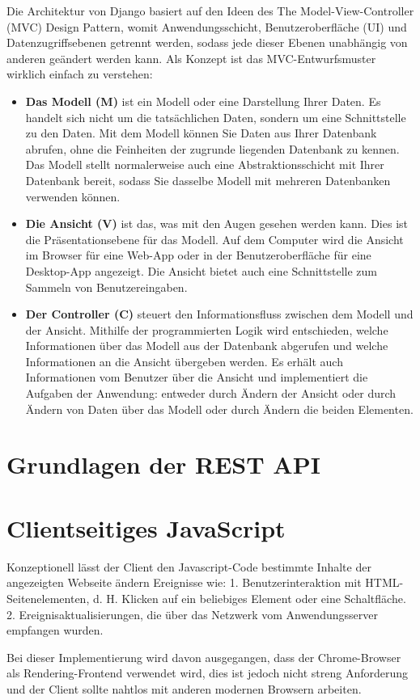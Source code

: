 Die Architektur von Django basiert auf den Ideen des The Model-View-Controller (MVC) Design Pattern, womit Anwendungsschicht, Benutzeroberfläche (UI) und Datenzugriffsebenen getrennt werden, sodass jede dieser Ebenen unabhängig von anderen geändert werden kann. Als Konzept ist das MVC-Entwurfsmuster wirklich einfach zu verstehen\cite[pp. 15-16]{george:django}:
\begin{itemize}
	\item \textbf{Das Modell (M)} ist ein Modell oder eine Darstellung Ihrer Daten. Es handelt sich nicht um die tatsächlichen Daten, sondern um eine Schnittstelle zu den Daten. Mit dem Modell können Sie Daten aus Ihrer Datenbank abrufen, ohne die Feinheiten der zugrunde liegenden Datenbank zu kennen. Das Modell stellt normalerweise auch eine Abstraktionsschicht mit Ihrer Datenbank bereit, sodass Sie dasselbe Modell mit mehreren Datenbanken verwenden können.
	\item \textbf{Die Ansicht (V)} ist das, was mit den Augen gesehen werden kann. Dies ist die Präsentationsebene für das Modell. Auf dem Computer wird die Ansicht im Browser für eine Web-App oder in der Benutzeroberfläche für eine Desktop-App angezeigt. Die Ansicht bietet auch eine Schnittstelle zum Sammeln von Benutzereingaben.
	\item \textbf{Der Controller (C)} steuert den Informationsfluss zwischen dem Modell und der Ansicht. Mithilfe der programmierten Logik wird entschieden, welche Informationen über das Modell aus der Datenbank abgerufen und welche Informationen an die Ansicht übergeben werden. Es erhält auch Informationen vom Benutzer über die Ansicht und implementiert die Aufgaben der Anwendung: entweder durch Ändern der Ansicht oder durch Ändern von Daten über das Modell oder durch Ändern die beiden Elementen.
\end{itemize}

\section{Grundlagen der REST API}
\label{sec:theorie:api}

\section{Clientseitiges JavaScript}
\label{sec:theorie:js}

Konzeptionell lässt der Client den Javascript-Code bestimmte Inhalte der angezeigten Webseite ändern
Ereignisse wie:
1. Benutzerinteraktion mit HTML-Seitenelementen, d. H. Klicken auf ein beliebiges Element oder eine Schaltfläche.
2. Ereignisaktualisierungen, die über das Netzwerk vom Anwendungsserver empfangen wurden.

Bei dieser Implementierung wird davon ausgegangen, dass der Chrome-Browser als Rendering-Frontend verwendet wird, dies ist jedoch nicht streng
Anforderung und der Client sollte nahtlos mit anderen modernen Browsern arbeiten.



